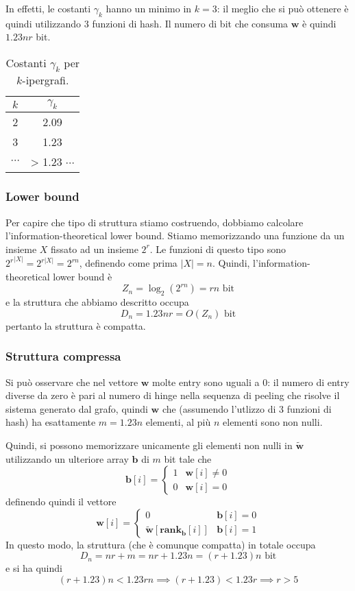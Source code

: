In effetti, le costanti $\gamma_k$ hanno un minimo in $k = 3$: il meglio che si può 
ottenere è quindi utilizzando $3$ funzioni di hash. Il numero di bit che consuma 
$\mathbf{w}$ è quindi $1.23nr$ bit.  

\begin{table}[htpb]
    \centering
    \begin{tabular}{c|c}
	 $k$ &  $\gamma_k$ \\ 
	 \hline 
	 2 & 2.09 \\
	 3 & 1.23 \\
	 $\cdots$ & > 1.23 $\cdots$
    \end{tabular}
    \caption{Costanti $\gamma_k$ per $k$-ipergrafi.}
    \label{tab:gamma_k_hypergraph}
\end{table}

\subsubsection{Lower bound}
Per capire che tipo di struttura stiamo costruendo, dobbiamo calcolare l'information-theoretical 
lower bound. Stiamo memorizzando una funzione da un insieme $X$ fissato ad un insieme $2^r$.  
Le funzioni di questo tipo sono ${2^{r}}^{|X|} = 2^{r|X|} = 2^{rn}$, definendo come prima $|X| = n$. 
Quindi, l'information-theoretical lower bound è 
$$
Z_n = \log_2(2^{rn}) = rn \text{ bit}
$$
e la struttura che abbiamo descritto occupa 
$$
D_n = 1.23nr = O(Z_n) \text{ bit}
$$
pertanto la struttura è compatta.

\subsubsection{Struttura compressa}
Si può osservare che nel vettore $\mathbf{w}$ molte entry sono uguali a $0$: il numero 
di entry diverse da zero è pari al numero di hinge nella sequenza di peeling 
che risolve il sistema generato dal grafo, quindi $\mathbf{w}$ che (assumendo 
l'utlizzo di $3$ funzioni di hash) ha esattamente $m = 1.23n$ elementi, al più
$n$ elementi sono non nulli. 

Quindi, si possono memorizzare unicamente gli elementi non nulli in $\tilde{\mathbf{w}}$ 
utilizzando un ulteriore array $\mathbf{b}$ di $m$ bit tale che 
$$
\mathbf{b}[i] = \begin{cases}
    1 & \mathbf{w}[i] \neq 0 \\
    0 & \mathbf{w}[i] = 0
\end{cases}
$$
definendo quindi il vettore 
$$
\mathbf{w}[i] = \begin{cases}
    0 & \mathbf{b}[i] = 0 \\
    \tilde{\mathbf{w}}[\mathbf{rank_b}[i]] & \mathbf{b}[i] = 1
\end{cases}
$$
In questo modo, la struttura (che è comunque compatta) in totale occupa 
$$
D_n = nr + m = nr + 1.23n = (r + 1.23) n \text{ bit}
$$
e si ha quindi 
$$
(r + 1.23 ) n < 1.23rn \implies (r + 1.23) < 1.23r  \implies r > 5
$$

